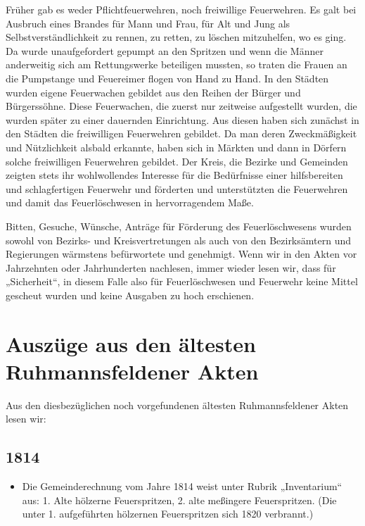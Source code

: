 \documentclass[12pt,a4paper]{book}
\begin{document}
Früher gab es weder Pflichtfeuerwehren, noch freiwillige Feuerwehren. Es
galt bei Ausbruch eines Brandes für Mann und Frau, für Alt und Jung als
Selbstverständlichkeit zu rennen, zu retten, zu löschen mitzuhelfen, wo
es ging. Da wurde unaufgefordert gepumpt an den Spritzen und wenn die
Männer anderweitig sich am Rettungswerke beteiligen mussten, so traten
die Frauen an die Pumpstange und Feuereimer flogen von Hand zu Hand. In
den Städten wurden eigene Feuerwachen gebildet aus den Reihen der Bürger
und Bürgerssöhne. Diese Feuerwachen, die zuerst nur zeitweise
aufgestellt wurden, die wurden später zu einer dauernden Einrichtung.
Aus diesen haben sich zunächst in den Städten die freiwilligen
Feuerwehren gebildet. Da man deren Zweckmäßigkeit und Nützlichkeit
alsbald erkannte, haben sich in Märkten und dann in Dörfern solche
freiwilligen Feuerwehren gebildet. Der Kreis, die Bezirke und Gemeinden
zeigten stets ihr wohlwollendes Interesse für die Bedürfnisse einer
hilfsbereiten und schlagfertigen Feuerwehr und förderten und
unterstützten die Feuerwehren und damit das Feuerlöschwesen in
hervorragendem Maße.

Bitten, Gesuche, Wünsche, Anträge für Förderung des Feuerlöschwesens
wurden sowohl von Bezirks- und Kreisvertretungen als auch von den
Bezirksämtern und Regierungen wärmstens befürwortete und genehmigt. Wenn
wir in den Akten vor Jahrzehnten oder Jahrhunderten nachlesen, immer
wieder lesen wir, dass für „Sicherheit“, in diesem Falle also für
Feuerlöschwesen und Feuerwehr keine Mittel gescheut wurden und keine
Ausgaben zu hoch erschienen.

\chapter{Auszüge aus den ältesten Ruhmannsfeldener Akten}

Aus den diesbezüglichen noch vorgefundenen ältesten Ruhmannsfeldener
Akten lesen wir:

\section*{1814}

\begin{itemize}
\item Die Gemeinderechnung vom Jahre 1814 weist unter Rubrik
„Inventarium“ aus: 1. Alte hölzerne Feuerspritzen, 2. alte meßingere
Feuerspritzen. (Die unter 1. aufgeführten hölzernen Feuerspritzen sich
1820 verbrannt.)
\end{itemize}
\end{document}
